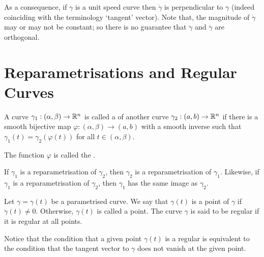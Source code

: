 \documentclass[11pt]{penrose}
\begin{document}
As a consequence, if $\gamma$ is a unit speed curve then $\dot{\gamma}$ is perpendicular to $\gamma$ (indeed coinciding with the terminology `tangent' vector). Note that, the magnitude of $\dot{\gamma}$ may or may not be constant; so there is no guarantee that $\ddot{\gamma}$ and $\dot{\gamma}$ are orthogonal.

\section{Reparametrisations and Regular Curves}
\begin{ndfn}
    A curve $\gamma_1 : (\alpha, \beta) \to \mathbb{R}^n$ is called a  of another curve $\gamma_2 : (a, b) \to \mathbb{R}^n$ if there is a smooth bijective map $\varphi : (\alpha, \beta) \to (a, b)$ with a smooth inverse such that $\gamma_1(t) = \gamma_2( \varphi(t) )$ for all $t \in (\alpha, \beta)$.
\end{ndfn}

The function $\varphi$ is called the .

If $\gamma_1$ is a reparametrisation of $\gamma_2$, then $\gamma_2$ is a reparametrisation of $\gamma_1$. Likewise, if $\gamma_1$ is a reparametrisation of $\gamma_2$, then $\gamma_1$ has the same image as $\gamma_2$.

\begin{ndfn}
    Let $\gamma = \gamma(t)$ be a parametrised curve. We say that $\gamma(t)$ is a  point of $\gamma$ if $\dot{\gamma}(t) \neq 0$. Otherwise, $\gamma(t)$ is called a  point. The curve $\gamma$ is said to be regular if it is regular at all points.
\end{ndfn}

Notice that the condition that a given point $\gamma(t)$ is a regular is equivalent to the condition that the tangent vector to $\gamma$ does not vanish at the given point.
\end{document}

